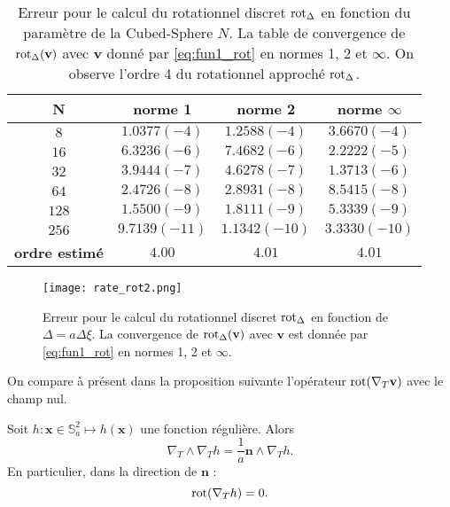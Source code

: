 \begin{table}[htbp]
\begin{center}
\begin{tabular}{|c||c|c|c|}
\hline
\textbf{N}  & \textbf{norme 1} & \textbf{norme 2} & \textbf{norme $\infty$} \\
\hline
\hline
$8$  & $1.0377(-4)$  & $1.2588(-4)$  & $3.6670(-4)$  \\
$16$ & $6.3236(-6)$  & $7.4682(-6)$  & $2.2222(-5)$  \\
$32$ & $3.9444(-7)$  & $4.6278(-7)$  & $1.3713(-6)$  \\
$64$ & $2.4726(-8)$  & $2.8931(-8)$  & $8.5415(-8)$  \\
$128$& $1.5500(-9)$  & $1.8111(-9)$  & $5.3339(-9)$  \\
$256$& $9.7139(-11)$ & $1.1342(-10)$ & $3.3330(-10)$ \\
\hline 
\hline
\textbf{ordre estimé}& $4.00$ & $4.01$ & $4.01$\\
\hline
\end{tabular}
\end{center}
\caption{Erreur pour le calcul du rotationnel discret $\text{rot}_{\Delta}$ en fonction du paramètre de la Cubed-Sphere $N$. La table de convergence de $\text{rot}_{\Delta} ( \mathbf{v} )$ avec $\mathbf{v}$ donné par \eqref{eq:fun1_rot} en normes 1, 2 et $\infty$. On observe l'ordre 4 du rotationnel approché $\text{rot}_{\Delta}$.}
\label{tab:rate_rot2}
\end{table} 

\begin{figure}[htbp]
\begin{center}
\texttt{[image: rate\_rot2.png]}
\end{center}
\caption{Erreur pour le calcul du rotationnel discret $\text{rot}_{\Delta}$ en fonction de $\Delta = a\Delta \xi$. La convergence de $\text{rot}_{\Delta} ( \mathbf{v} )$ avec $\mathbf{v}$ est donnée par \eqref{eq:fun1_rot} en normes 1, 2 et $\infty$.}
\label{fig:rate_rot2}
\end{figure}

On compare à présent dans la proposition suivante l'opérateur $\text{rot}(\nabla_T \mathbf{v})$ avec le champ nul.

\begin{proposition}
Soit $h : \mathbf{x} \in \mathbb{S}_a^2 \mapsto h(\mathbf{x})$ une fonction régulière. Alors 
\begin{equation}
\nabla_T \wedge \nabla_T h = \dfrac{1}{a} \mathbf{n} \wedge \nabla_T h.
\end{equation}
En particulier, dans la direction de $\mathbf{n}$ :
\begin{equation}
\text{rot}(\nabla_T h) = 0.
\end{equation}
\label{prop:vort_grad}
\end{proposition}

